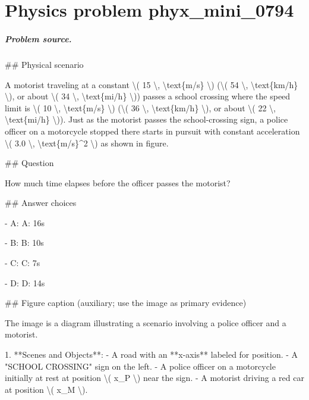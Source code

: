 
\chapter{Physics problem phyx\_mini\_0794}
\label{ch:PhyXMiniProblems_problem_phyx_mini_0794}

\paragraph{Problem source.}
\#\# Physical scenario

A motorist traveling at a constant \textbackslash{}( 15 \textbackslash{}, \textbackslash{}text\{m/s\} \textbackslash{}) (\textbackslash{}( 54 \textbackslash{}, \textbackslash{}text\{km/h\} \textbackslash{}), or about \textbackslash{}( 34 \textbackslash{}, \textbackslash{}text\{mi/h\} \textbackslash{})) passes a school crossing where the speed limit is \textbackslash{}( 10 \textbackslash{}, \textbackslash{}text\{m/s\} \textbackslash{}) (\textbackslash{}( 36 \textbackslash{}, \textbackslash{}text\{km/h\} \textbackslash{}), or about \textbackslash{}( 22 \textbackslash{}, \textbackslash{}text\{mi/h\} \textbackslash{})). Just as the motorist passes the school-crossing sign, a police officer on a motorcycle stopped there starts in pursuit with constant acceleration \textbackslash{}( 3.0 \textbackslash{}, \textbackslash{}text\{m/s\}\textasciicircum{}2 \textbackslash{}) as shown in figure.

\#\# Question

How much time elapses before the officer passes the motorist?

\#\# Answer choices

- A: A: 16s

- B: B: 10s

- C: C: 7s

- D: D: 14s

\#\# Figure caption (auxiliary; use the image as primary evidence)

The image is a diagram illustrating a scenario involving a police officer and a motorist.

1. **Scenes and Objects**:
   - A road with an **x-axis** labeled for position.
   - A "SCHOOL CROSSING" sign on the left.
   - A police officer on a motorcycle initially at rest at position \textbackslash{}( x\_P \textbackslash{}) near the sign.
   - A motorist driving a red car at position \textbackslash{}( x\_M \textbackslash{}).


